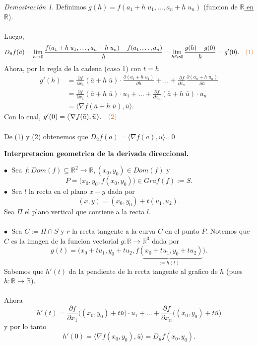 \documentclass{article}
\theoremstyle{definition}
\theoremstyle{definition}
\theoremstyle{remark}
\newtheorem*{demo}{Demostración}
\newcommand\bl{$\bullet\;$}
\begin{document}
\begin{demo}
  Definimos $g(h)=f(a_1+h\;u_1,\dots,a_n+h\;u_n)$ \quad \big(funcion de \underline{$\mathbb{R}$ en $\mathbb{R}$}\big).\\\\
  Luego, \[ 
    D_{\bar{u}}f(\bar{a})=\lim_{h \to 0}{\frac{f(a_1+h \; u_1, \dots , a_n+h \; u_n)-f(a_1,\dots, a_n)}{h}}=\lim_{h t\o 0}{\frac{g(h)-g(0)}{h}}=g'(0). \quad \textcolor{rojop2}{(1)}
  \]
Ahora, por la regla de la cadena (caso 1) con $t=h$ \[
  \begin{aligned}
    g'(h) & = \frac{\partial f }{\partial x_1}(\bar{a}+h \; \bar{u}) \cdot \frac{\partial (a_1+h \; u_1)}{\partial h} + \dots + \frac{\partial f}{\partial x_n}\frac{\partial (a_n+h \; u_n)}{\partial h} \\
          &= \frac{\partial f}{\partial x_1}(\bar{a} + h  \; \bar{u}) \cdot u_1 + \dots + \frac{\partial f}{\partial x_n}(\bar{a}+h \; \bar{u}) \cdot u_n \\
          & = \big\langle \nabla f(\bar{a}+h\;\bar{u}),\bar{u}\big\rangle.
  \end{aligned}
\]
Con lo cual, $g'(0)=\big\langle \nabla f(\bar{a}),\bar{u} \big\rangle. \quad \textcolor{rojop2}{(2)}$ \\\\
De \textcolor{rojop2}{(1)} y \textcolor{rojop2}{(2)} obtenemos que $D_{\bar{u}}f(\bar{a})=\big\langle \nabla f(\bar{a}),\bar{u} \big\rangle$.
  \qed
  \end{demo}
\begin{center}
\textbf{Interpretacion geometrica de la derivada direccional.}
\end{center}
\textcolor{verdep2}{\bl} Sea $f: Dom(f) \subseteq \mathbb{R}^2 \to \mathbb{R}, (x_0,y_0) \in Dom(f)$ y \[
P=\big(x_0,y_0,f(x_0,y_0)\big) \in Graf(f):=S.
\]
\textcolor{verdep2}{\bl} Sea $l$ la recta en el plano $x-y$ dada por \[
  (x,y) = (x_0,y_0)+t(u_1,u_2).
\]
Sea $\Pi$ el plano vertical que contiene a la recta $l$. \\\\
\textcolor{verdep2}{\bl} Sea $C := \Pi \cap S$ y $r$ la recta tangente a la curva $C$ en el punto $P$. Notemos que $C$ es la imagen de la funcion vectorial $g : \mathbb{R} \to \mathbb{R}^3$ dada por \[
  g(t)=\big(x_0+tu_1,y_0+tu_2,\underbrace{f(x_0+tu_1,y_0+tu_2)}_{:= h(t)}\big).
\]
Sabemos que $h'(t)$ da la pendiente de la recta tangente al grafico de $h$ (pues $h : \mathbb{R} \to \mathbb{R}$). \\\\
Ahora \[
h'(t)=\frac{\partial f}{\partial x_1}\big((x_0,y_0)+t\bar{u}\big)\cdot u_1 + \dots + \frac{\partial f}{\partial x_n}\big((x_0,y_0)+t\bar{u}\big)
  \] y por lo tanto \[
  h'(0)=\big\langle \nabla f(x_0,y_0),\bar{u}\big\rangle=D_{\bar{u}}f(x_0,y_0).
\]
\end{document}
